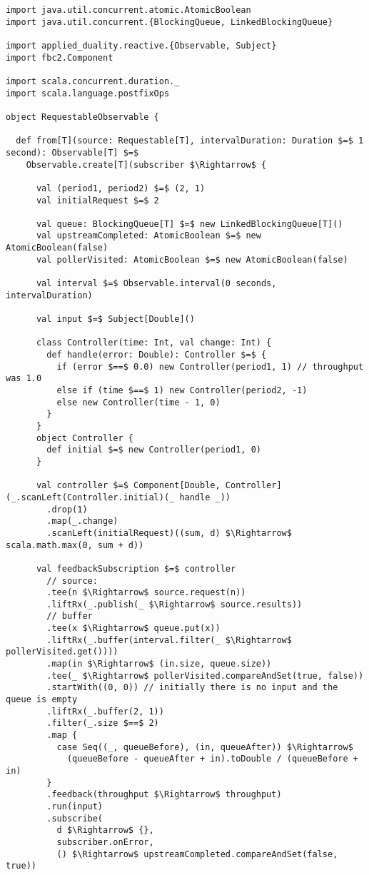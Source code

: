 \begin{lstlisting}[style=ScalaStyle, caption={Implementation of \code{RequestableObservable}}]
import java.util.concurrent.atomic.AtomicBoolean
import java.util.concurrent.{BlockingQueue, LinkedBlockingQueue}

import applied_duality.reactive.{Observable, Subject}
import fbc2.Component

import scala.concurrent.duration._
import scala.language.postfixOps

object RequestableObservable {

  def from[T](source: Requestable[T], intervalDuration: Duration $=$ 1 second): Observable[T] $=$
    Observable.create[T](subscriber $\Rightarrow$ {

      val (period1, period2) $=$ (2, 1)
      val initialRequest $=$ 2

      val queue: BlockingQueue[T] $=$ new LinkedBlockingQueue[T]()
      val upstreamCompleted: AtomicBoolean $=$ new AtomicBoolean(false)
      val pollerVisited: AtomicBoolean $=$ new AtomicBoolean(false)

      val interval $=$ Observable.interval(0 seconds, intervalDuration)

      val input $=$ Subject[Double]()

      class Controller(time: Int, val change: Int) {
        def handle(error: Double): Controller $=$ {
          if (error $==$ 0.0) new Controller(period1, 1) // throughput was 1.0
          else if (time $==$ 1) new Controller(period2, -1)
          else new Controller(time - 1, 0)
        }
      }
      object Controller {
        def initial $=$ new Controller(period1, 0)
      }

      val controller $=$ Component[Double, Controller](_.scanLeft(Controller.initial)(_ handle _))
        .drop(1)
        .map(_.change)
        .scanLeft(initialRequest)((sum, d) $\Rightarrow$ scala.math.max(0, sum + d))

      val feedbackSubscription $=$ controller
        // source:
        .tee(n $\Rightarrow$ source.request(n))
        .liftRx(_.publish(_ $\Rightarrow$ source.results))
        // buffer
        .tee(x $\Rightarrow$ queue.put(x))
        .liftRx(_.buffer(interval.filter(_ $\Rightarrow$ pollerVisited.get())))
        .map(in $\Rightarrow$ (in.size, queue.size))
        .tee(_ $\Rightarrow$ pollerVisited.compareAndSet(true, false))
        .startWith((0, 0)) // initially there is no input and the queue is empty
        .liftRx(_.buffer(2, 1))
        .filter(_.size $==$ 2)
        .map {
          case Seq((_, queueBefore), (in, queueAfter)) $\Rightarrow$
            (queueBefore - queueAfter + in).toDouble / (queueBefore + in)
        }
        .feedback(throughput $\Rightarrow$ throughput)
        .run(input)
        .subscribe(
          d $\Rightarrow$ {},
          subscriber.onError,
          () $\Rightarrow$ upstreamCompleted.compareAndSet(false, true))


\end{lstlisting}
